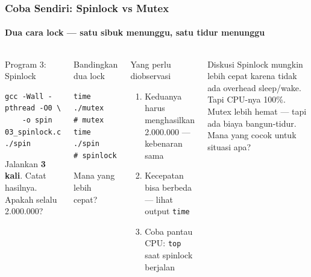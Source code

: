 \documentclass[t,aspectratio=169,xcolor=dvipsnames]{beamer}
\begin{document}
\begin{frame}[fragile,shrink=5]
    \frametitle{Coba Sendiri: Spinlock vs Mutex}
    \framesubtitle{Dua cara lock — satu sibuk menunggu, satu tidur menunggu}
    \small

    \begin{columns}[T]
        \begin{alertblock}{Program 3: Spinlock}
\begin{lstlisting}[basicstyle=\ttfamily\scriptsize]
gcc -Wall -pthread -O0 \
    -o spin 03_spinlock.c
./spin
\end{lstlisting}
            Jalankan \textbf{3 kali}. Catat hasilnya.\\
            Apakah selalu 2.000.000?
        \end{alertblock}

        \begin{block}{Bandingkan dua lock}
\begin{lstlisting}[basicstyle=\ttfamily\scriptsize]
time ./mutex   # mutex
time ./spin    # spinlock
\end{lstlisting}
            Mana yang lebih cepat?
        \end{block}

        \begin{exampleblock}{Yang perlu diobservasi}
            \begin{enumerate}
                \item Keduanya harus menghasilkan 2.000.000 — kebenaran sama
                \item Kecepatan bisa berbeda — lihat output \texttt{time}
                \item Coba pantau CPU: \texttt{top} saat spinlock berjalan
            \end{enumerate}
        \end{exampleblock}

        \begin{block}{Diskusi}
            \footnotesize
            Spinlock mungkin lebih cepat karena tidak ada overhead sleep/wake. Tapi CPU-nya 100\%. Mutex lebih hemat — tapi ada biaya bangun-tidur. Mana yang cocok untuk situasi apa?
        \end{block}
    \end{columns}
\end{frame}
\end{document}

